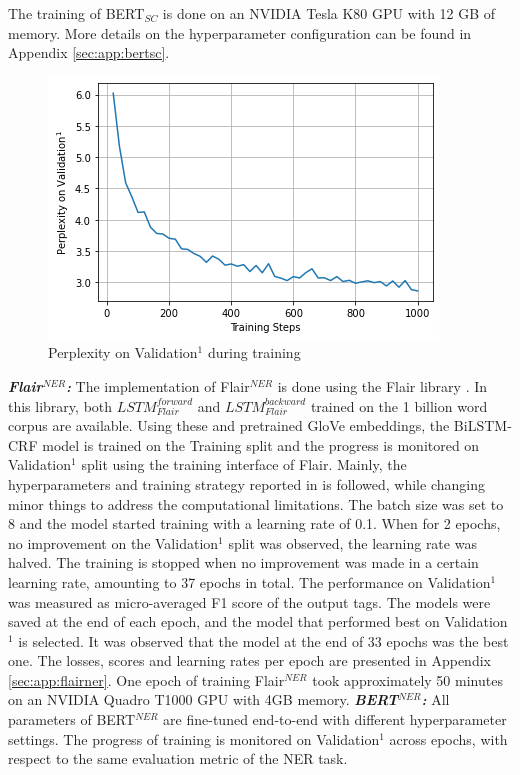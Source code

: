 \documentclass{report}
\theoremstyle{definition}
\theoremstyle{remark}
\begin{document}
The training of BERT$_{SC}$ is done on an NVIDIA Tesla K80 GPU with 12 GB of memory. More details on the hyperparameter configuration can be found in Appendix \ref{sec:app:bertsc}.

\begin{figure}[H]
    \centering
    \includegraphics[scale=0.7]{perpplot.png}
    \caption{Perplexity on Validation$^1$ during training}
    \label{fig:perp}
\end{figure}

\noindent \textit{\textbf{Flair}}$^{NER}$\textit{\textbf{:}} The implementation of Flair$^{NER}$ is done using the Flair library \cite{flairlib}. In this library, both $LSTM^{forward}_{Flair}$ and $LSTM^{backward}_{Flair}$ trained on the 1 billion word corpus \cite{onebillion} are available. Using these and pretrained GloVe embeddings, the BiLSTM-CRF model is trained on the Training split and the progress is monitored on Validation$^1$ split using the training interface of Flair.  Mainly, the hyperparameters and training strategy reported in \cite{flairpaper} is followed, while changing minor things to address the computational limitations. The batch size was set to 8 and the model started training with a learning rate of 0.1. When for 2 epochs, no improvement on the Validation$^1$ split was observed, the learning rate was halved. The training is stopped when no improvement was made in a certain learning rate, amounting to 37 epochs in total. The performance on Validation$^1$ was measured as micro-averaged F1 score of the output tags. The models were saved at the end of each epoch, and the model that performed best on Validation$^1$ is selected. It was observed that the model at the end of 33 epochs was the best one. The losses, scores and learning rates per epoch are presented in Appendix \ref{sec:app:flairner}. One epoch of training Flair$^{NER}$ took approximately 50 minutes on an NVIDIA Quadro T1000 GPU with 4GB memory. 
\newline
\newline
\textit{\textbf{BERT}}$^{NER}$\textit{\textbf{:}} All parameters of BERT$^{NER}$ are fine-tuned end-to-end with different hyperparameter settings. The progress of training is monitored on Validation$^1$ across epochs, with respect to the same evaluation metric of the NER task.
\end{document}
